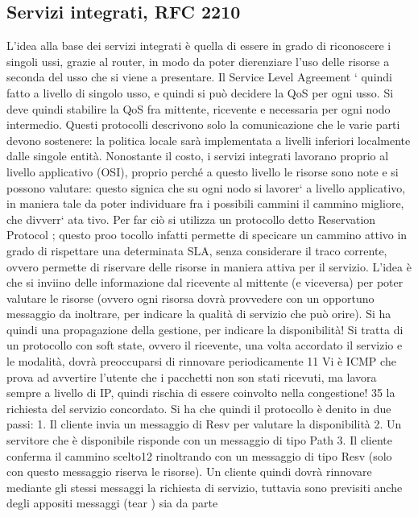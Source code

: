 \subsection{Servizi integrati, RFC 2210}
L'idea alla base dei servizi integrati è quella di essere in grado di riconoscere i
singoli ussi, grazie al router, in modo da poter dierenziare l'uso delle risorse
a seconda del usso che si viene a presentare. Il Service Level Agreement `
quindi fatto a livello di singolo usso, e quindi si può decidere la QoS per ogni
usso. Si deve quindi stabilire la QoS fra mittente, ricevente e necessaria per
ogni nodo intermedio. Questi protocolli descrivono solo la comunicazione che
le varie parti devono sostenere: la politica locale sarà implementata a livelli
inferiori localmente dalle singole entità.
Nonostante il costo, i servizi integrati lavorano proprio al livello applicativo
(OSI), proprio perché a questo livello le risorse sono note e si possono valutare:
questo signica che su ogni nodo si lavorer` a livello applicativo, in maniera tale
da poter individuare fra i possibili cammini il cammino migliore, che divverr` ata
tivo. Per far ciò si utilizza un protocollo detto Reservation Protocol ; questo proo
tocollo infatti permette di specicare un cammino attivo in grado di rispettare
una determinata SLA, senza considerare il traco corrente, ovvero permette di
riservare delle risorse in maniera attiva per il servizio. L'idea è che si inviino
delle informazione dal ricevente al mittente (e viceversa) per poter valutare le
risorse (ovvero ogni risorsa dovrà provvedere con un opportuno messaggio da
inoltrare, per indicare la qualità di servizio che può orire). Si ha quindi una
propagazione della gestione, per indicare la disponibilità!
Si tratta di un protocollo con soft state, ovvero il ricevente, una volta accordato il servizio e le modalità, dovrà
preoccuparsi di rinnovare periodicamente
11 Vi è ICMP che prova ad avvertire l'utente che i pacchetti non son stati ricevuti, ma lavora
sempre a livello di IP, quindi rischia di essere coinvolto nella congestione!
35
la richiesta del servizio concordato. Si ha che quindi il protocollo è denito in
due passi:
1. Il cliente invia un messaggio di Resv per valutare la disponibilità
2. Un servitore che è disponibile risponde con un messaggio di tipo Path
3. Il cliente conferma il cammino scelto12 rinoltrando con un messaggio di
tipo Resv (solo con questo messaggio riserva le risorse).
Un cliente quindi dovrà rinnovare mediante gli stessi messaggi la richiesta di
servizio, tuttavia sono previsiti anche degli appositi messaggi (tear ) sia da parte
